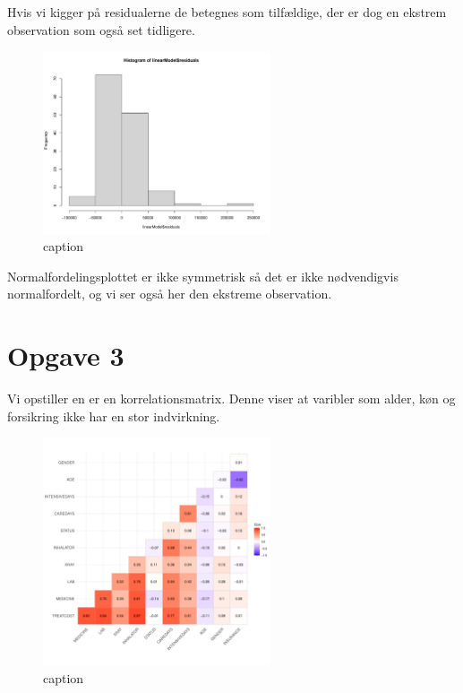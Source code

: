 \documentclass{article}
\begin{document}
Hvis vi kigger på residualerne de betegnes som tilfældige, der er dog en ekstrem
observation som også set tidligere.

\begin{figure}[H]
  \centering
  \includegraphics[width=0.6\textwidth]{./plots/caredaysResidualsHist.pdf}
  \caption{caption}
\end{figure}

Normalfordelingsplottet er ikke symmetrisk så det er ikke nødvendigvis
normalfordelt, og vi ser også her den ekstreme observation.


\section{Opgave 3}

Vi opstiller en er en korrelationsmatrix. Denne viser at varibler som alder, køn
og forsikring ikke har en stor indvirkning.

\begin{figure}[H]
  \centering
  \includegraphics[width=0.6\textwidth]{./plots/corretlationMatrix.pdf}
  \caption{caption}
\end{figure}
\end{document}
